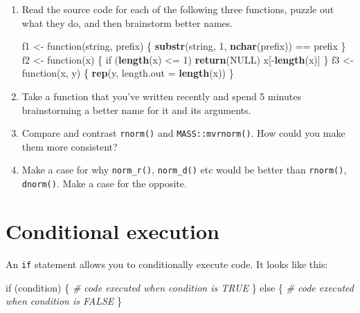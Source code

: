 \documentclass[]{book}
\newenvironment{Shaded}{\begin{snugshade}}{\end{snugshade}}
\newcommand{\KeywordTok}[1]{\textcolor[rgb]{0.13,0.29,0.53}{\textbf{{#1}}}}
\newcommand{\DataTypeTok}[1]{\textcolor[rgb]{0.13,0.29,0.53}{{#1}}}
\newcommand{\DecValTok}[1]{\textcolor[rgb]{0.00,0.00,0.81}{{#1}}}
\newcommand{\StringTok}[1]{\textcolor[rgb]{0.31,0.60,0.02}{{#1}}}
\newcommand{\CommentTok}[1]{\textcolor[rgb]{0.56,0.35,0.01}{\textit{{#1}}}}
\newcommand{\OtherTok}[1]{\textcolor[rgb]{0.56,0.35,0.01}{{#1}}}
\newcommand{\NormalTok}[1]{{#1}}
\begin{document}
\begin{enumerate}
\def\labelenumi{\arabic{enumi}.}
\item
  Read the source code for each of the following three functions, puzzle
  out what they do, and then brainstorm better names.

\begin{Shaded}
\begin{Highlighting}[]
\NormalTok{f1 <-}\StringTok{ }\NormalTok{function(string, prefix) \{}
  \KeywordTok{substr}\NormalTok{(string, }\DecValTok{1}\NormalTok{, }\KeywordTok{nchar}\NormalTok{(prefix)) ==}\StringTok{ }\NormalTok{prefix}
\NormalTok{\}}
\NormalTok{f2 <-}\StringTok{ }\NormalTok{function(x) \{}
  \NormalTok{if (}\KeywordTok{length}\NormalTok{(x) <=}\StringTok{ }\DecValTok{1}\NormalTok{) }\KeywordTok{return}\NormalTok{(}\OtherTok{NULL}\NormalTok{)}
  \NormalTok{x[-}\KeywordTok{length}\NormalTok{(x)]}
\NormalTok{\}}
\NormalTok{f3 <-}\StringTok{ }\NormalTok{function(x, y) \{}
  \KeywordTok{rep}\NormalTok{(y, }\DataTypeTok{length.out =} \KeywordTok{length}\NormalTok{(x))}
\NormalTok{\}}
\end{Highlighting}
\end{Shaded}
\item
  Take a function that you've written recently and spend 5 minutes
  brainstorming a better name for it and its arguments.
\item
  Compare and contrast \texttt{rnorm()} and \texttt{MASS::mvrnorm()}.
  How could you make them more consistent?
\item
  Make a case for why \texttt{norm\_r()}, \texttt{norm\_d()} etc would
  be better than \texttt{rnorm()}, \texttt{dnorm()}. Make a case for the
  opposite.
\end{enumerate}

\hypertarget{conditional-execution}{\section{Conditional
execution}\label{conditional-execution}}

An \texttt{if} statement allows you to conditionally execute code. It
looks like this:

\begin{Shaded}
\begin{Highlighting}[]
\NormalTok{if (condition) \{}
  \CommentTok{# code executed when condition is TRUE}
\NormalTok{\} else \{}
  \CommentTok{# code executed when condition is FALSE}
\NormalTok{\}}
\end{Highlighting}
\end{Shaded}
\end{document}
